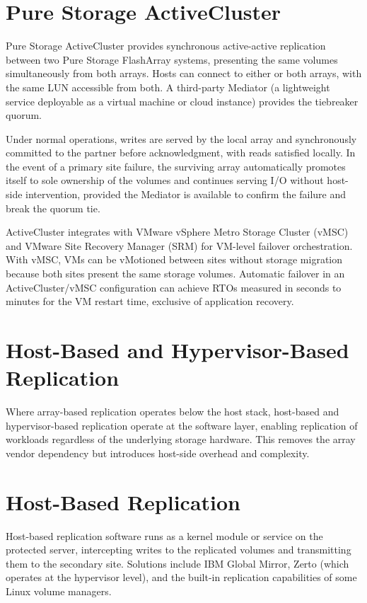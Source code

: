 \section{Pure Storage ActiveCluster}
Pure Storage ActiveCluster provides synchronous active-active replication between two Pure Storage FlashArray systems, presenting the same volumes simultaneously from both arrays. Hosts can connect to either or both arrays, with the same LUN accessible from both. A third-party Mediator (a lightweight service deployable as a virtual machine or cloud instance) provides the tiebreaker quorum.

Under normal operations, writes are served by the local array and synchronously committed to the partner before acknowledgment, with reads satisfied locally. In the event of a primary site failure, the surviving array automatically promotes itself to sole ownership of the volumes and continues serving I/O without host-side intervention, provided the Mediator is available to confirm the failure and break the quorum tie.

ActiveCluster integrates with VMware vSphere Metro Storage Cluster (vMSC) and VMware Site Recovery Manager (SRM) for VM-level failover orchestration. With vMSC, VMs can be vMotioned between sites without storage migration because both sites present the same storage volumes. Automatic failover in an ActiveCluster/vMSC configuration can achieve RTOs measured in seconds to minutes for the VM restart time, exclusive of application recovery.

\section{Host-Based and Hypervisor-Based Replication}
Where array-based replication operates below the host stack, host-based and hypervisor-based replication operate at the software layer, enabling replication of workloads regardless of the underlying storage hardware. This removes the array vendor dependency but introduces host-side overhead and complexity.

\section{Host-Based Replication}
Host-based replication software runs as a kernel module or service on the protected server, intercepting writes to the replicated volumes and transmitting them to the secondary site. Solutions include IBM Global Mirror, Zerto (which operates at the hypervisor level), and the built-in replication capabilities of some Linux volume managers.

